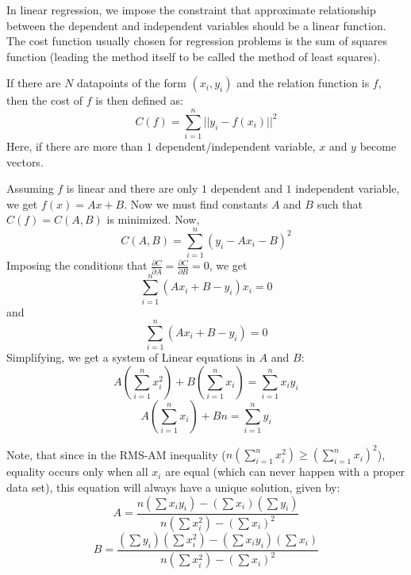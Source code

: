 \documentclass[12 pt]{report}
\begin{document}
    In linear regression, we impose the constraint that approximate relationship between the dependent and independent variables should be a linear 
    function. The cost function usually chosen for regression problems is the sum of squares function (leading the method itself to be called the 
    method of least squares). 

    If there are $N$ datapoints of the form $(x_{i}, y_{i})$ and the relation function is $f$, then the cost of $f$ is then  defined as:
    \begin{equation}
        C(f) = \sum_{i = 1}^{n} ||y_{i} - f(x_{i})||^{2}
    \end{equation}
    Here, if there are more than $1$ dependent/independent variable, $x$ and $y$ become vectors.

    Assuming $f$ is linear and there are only $1$ dependent and $1$ independent variable, we get $f(x) = Ax + B$. Now we must find constants $A$ and $B$ such that $C(f) = C(A, B)$ is minimized. Now,
    \begin{equation}
        C(A, B) = \sum_{i = 1}^{n} (y_{i} - Ax_{i} - B)^{2}
    \end{equation}
    Imposing the conditions that $\frac{\partial C}{\partial A} = \frac{\partial C}{\partial B} = 0$, we get
    \begin{equation}
        \sum_{i = 1}^{n} (Ax_{i} + B - y_{i})x_{i} = 0
    \end{equation}
    and
    \begin{equation}
        \sum_{i = 1}^{n} (Ax_{i} + B - y_{i}) = 0
    \end{equation}
    Simplifying, we get a system of Linear equations in $A$ and $B$:
    \begin{equation}
        A(\sum_{i = 1}^{n} x_{i}^{2}) + B(\sum_{i = 1}^{n} x_{i}) = \sum_{i = 1}^{n} x_{i}y_{i}
    \end{equation}
    \begin{equation}
        A(\sum_{i = 1}^{n} x_{i}) + Bn = \sum_{i = 1}^{n} y_{i}
    \end{equation}

    Note, that since in the RMS-AM inequality ($n(\sum_{i = 1}^{n} x_{i}^{2}) \geq (\sum_{i = 1}^{n} x_{i})^{2}$), equality occurs only when all 
    $x_{i}$ are equal (which can never happen with a proper data set), this equation will always have a unique solution, given by:
    \begin{equation}
        A = \frac{n(\sum x_{i}y_{i}) - (\sum x_{i})(\sum y_{i})}{n(\sum x_{i}^{2}) - (\sum x_{i})^{2}}
    \end{equation}
    \begin{equation}
        B = \frac{(\sum y_{i})(\sum x_{i}^{2}) - (\sum x_{i}y_{i})(\sum x_{i})}{n(\sum x_{i}^{2}) - (\sum x_{i})^{2}}
    \end{equation}
\end{document}
